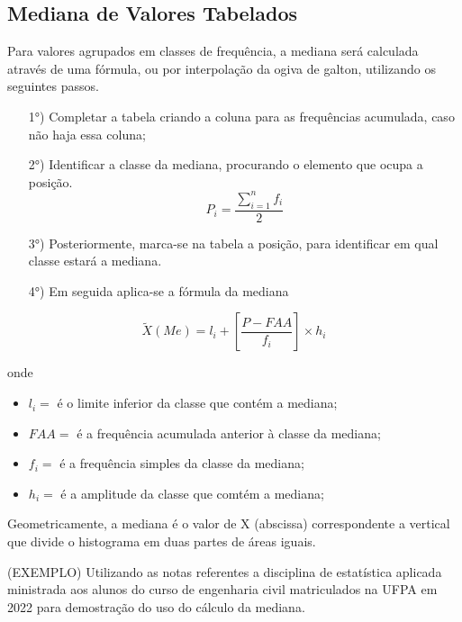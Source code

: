 \subsection{Mediana de Valores Tabelados}


Para valores agrupados em classes de frequência, a mediana será calculada através de uma fórmula, ou por interpolação da ogiva de galton, utilizando os seguintes passos.



\begin{enumerate}
\item [{1°)}] Completar a tabela criando a coluna para as frequências acumulada, caso não haja essa coluna;
\item [{2°)}]Identificar a classe da mediana, procurando o elemento que ocupa a posição.
$$ P_{i}=\frac{\sum_{i=1}^{n}f_{i}}{2}$$
\item [{3°)}] Posteriormente, marca-se na tabela a posição, para identificar em qual classe estará a mediana.
\item [{4°)}] Em seguida aplica-se a fórmula da mediana
\end{enumerate}

\begin{equation}\label{}
    \tilde{X}(Me)=l_{i}+\left[\frac{P-FAA}{f_{i}}\right]\times h_{i}
\end{equation}

 onde

 \begin{itemize}
   \item $l_{i}=$ é o limite inferior da classe que contém a mediana;
   \item $FAA=$ é a frequência acumulada anterior à classe da mediana;
   \item $f_{i}=$ é a frequência simples da classe da mediana;
   \item $h_{i}=$ é a amplitude da classe que comtém a mediana;
 \end{itemize}


Geometricamente, a mediana é o valor de X (abscissa) correspondente a vertical que divide o histograma em duas partes de áreas iguais.\vskip0.3cm


(EXEMPLO) Utilizando as notas referentes a disciplina de estatística aplicada ministrada aos alunos do curso de engenharia civil matriculados na UFPA em 2022 para demostração do uso do cálculo da mediana.



